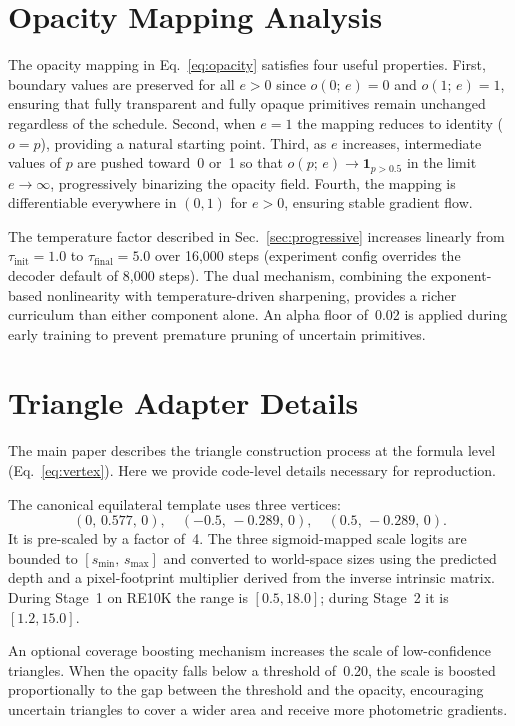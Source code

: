 \documentclass{llmxive}
\begin{document}
\section{Opacity Mapping Analysis}
\label{sec:app_opacity_derivation}

The opacity mapping in Eq.~\eqref{eq:opacity} satisfies four useful properties. First, boundary values are preserved for all $e > 0$ since $o(0;\,e) = 0$ and $o(1;\,e) = 1$, ensuring that fully transparent and fully opaque primitives remain unchanged regardless of the schedule. Second, when $e = 1$ the mapping reduces to identity ($o = p$), providing a natural starting point. Third, as $e$ increases, intermediate values of $p$ are pushed toward~0 or~1 so that $o(p;\,e) \to \mathbf{1}_{p > 0.5}$ in the limit $e \to \infty$, progressively binarizing the opacity field. Fourth, the mapping is differentiable everywhere in $(0,1)$ for $e > 0$, ensuring stable gradient flow.

The temperature factor described in Sec.~\ref{sec:progressive} increases linearly from $\tau_{\mathrm{init}} = 1.0$ to $\tau_{\mathrm{final}} = 5.0$ over 16{,}000 steps (experiment config overrides the decoder default of 8{,}000 steps). The dual mechanism, combining the exponent-based nonlinearity with temperature-driven sharpening, provides a richer curriculum than either component alone. An alpha floor of~0.02 is applied during early training to prevent premature pruning of uncertain primitives.

\section{Triangle Adapter Details}
\label{sec:app_triangle_adapter}

The main paper describes the triangle construction process at the formula level (Eq.~\eqref{eq:vertex}). Here we provide code-level details necessary for reproduction.

The canonical equilateral template uses three vertices:
\[
(0,\, 0.577,\, 0),\quad
(-0.5,\, -0.289,\, 0),\quad
(0.5,\, -0.289,\, 0).
\]
It is pre-scaled by a factor of~4. The three sigmoid-mapped scale logits are bounded to $[s_{\min},\, s_{\max}]$ and converted to world-space sizes using the predicted depth and a pixel-footprint multiplier derived from the inverse intrinsic matrix. During Stage~1 on RE10K the range is $[0.5, 18.0]$; during Stage~2 it is $[1.2, 15.0]$.

An optional coverage boosting mechanism increases the scale of low-confidence triangles. When the opacity falls below a threshold of~0.20, the scale is boosted proportionally to the gap between the threshold and the opacity, encouraging uncertain triangles to cover a wider area and receive more photometric gradients.
\end{document}
